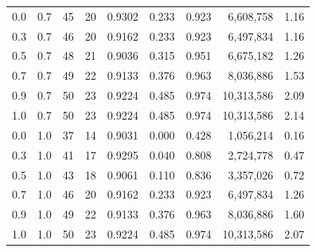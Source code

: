 \begin{table}[!htbp]
\begin{tabular}{ccrrrrrrr}
\hline
0.0 & 0.7 & 45 & 20 & 0.9302 & 0.233 & 0.923 & 6,608,758 & 1.16 \\
0.3 & 0.7 & 46 & 20 & 0.9162 & 0.233 & 0.923 & 6,497,834 & 1.16 \\
0.5 & 0.7 & 48 & 21 & 0.9036 & 0.315 & 0.951 & 6,675,182 & 1.26 \\
0.7 & 0.7 & 49 & 22 & 0.9133 & 0.376 & 0.963 & 8,036,886 & 1.53 \\
0.9 & 0.7 & 50 & 23 & 0.9224 & 0.485 & 0.974 & 10,313,586 & 2.09 \\
1.0 & 0.7 & 50 & 23 & 0.9224 & 0.485 & 0.974 & 10,313,586 & 2.14 \\
\hline
0.0 & 1.0 & 37 & 14 & 0.9031 & 0.000 & 0.428 & 1,056,214 & 0.16 \\
0.3 & 1.0 & 41 & 17 & 0.9295 & 0.040 & 0.808 & 2,724,778 & 0.47 \\
0.5 & 1.0 & 43 & 18 & 0.9061 & 0.110 & 0.836 & 3,357,026 & 0.72 \\
0.7 & 1.0 & 46 & 20 & 0.9162 & 0.233 & 0.923 & 6,497,834 & 1.26 \\
0.9 & 1.0 & 49 & 22 & 0.9133 & 0.376 & 0.963 & 8,036,886 & 1.60 \\
1.0 & 1.0 & 50 & 23 & 0.9224 & 0.485 & 0.974 & 10,313,586 & 2.07 \\
\hline
\end{tabular}
\end{table}
